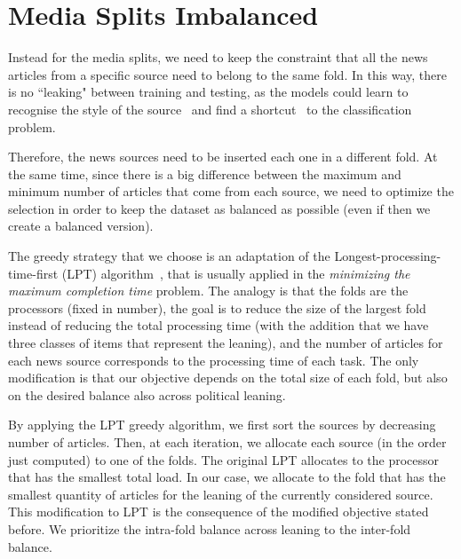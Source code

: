 \section{Media Splits Imbalanced}

Instead for the media splits, we need to keep the constraint that all the news articles from a specific source need to belong to the same fold. In this way, there is no ``leaking" between training and testing, as the models could learn to recognise the style of the source~\citep{baly2020we} and find a shortcut~\citep{geirhos2020shortcut} to the classification problem.

Therefore, the news sources need to be inserted each one in a different fold. At the same time, since there is a big difference between the maximum and minimum number of articles that come from each source, we need to optimize the selection in order to keep the dataset as balanced as possible (even if then we create a balanced version).


The greedy strategy that we choose is an adaptation of the Longest-processing-time-first (LPT) algorithm~\citep{graham1969bounds}, that is usually applied in the \emph{minimizing the maximum completion time} problem.
The analogy is that the folds are the processors (fixed in number), the goal is to reduce the size of the largest fold instead of reducing the total processing time (with the addition that we have three classes of items that represent the leaning), and the number of articles for each news source corresponds to the processing time of each task.
The only modification is that our objective depends on the total size of each fold, but also on the desired balance also across political leaning.

By applying the LPT greedy algorithm, we first sort the sources by decreasing number of articles. Then, at each iteration, we allocate each source (in the order just computed) to one of the folds. The original LPT allocates to the processor that has the smallest total load. In our case, we allocate to the fold that has the smallest quantity of articles for the leaning of the currently considered source.
This modification to LPT is the consequence of the modified objective stated before.
We prioritize the intra-fold balance across leaning to the inter-fold balance.

